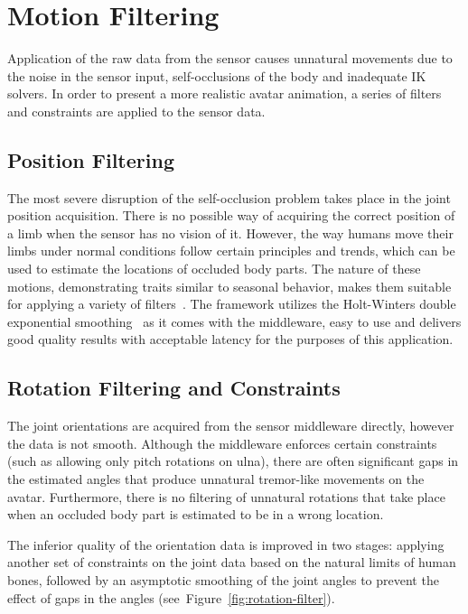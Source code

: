 \section{Motion Filtering}
\label{section_motion_filtering}

Application of the raw data from the sensor causes unnatural movements due to the noise in the sensor input, self-occlusions of the body and inadequate IK solvers. In order to present a more realistic avatar animation, a series of filters and constraints are applied to the sensor data. 

\subsection{Position Filtering}
The most severe disruption of the self-occlusion problem takes place in the joint position acquisition. There is no possible way of acquiring the correct position of a limb when the sensor has no vision of it. However, the way humans move their limbs under normal conditions follow certain principles and trends, which can be used to estimate the locations of occluded body parts. The nature of these motions, demonstrating traits similar to seasonal behavior, makes them suitable for applying a variety of filters~\cite{Azimi2012}. The framework utilizes the Holt-Winters double exponential smoothing~\cite{Holt2004,Kalekar2004}  as it comes with the middleware, easy to use and delivers good quality results with acceptable latency for the purposes of this application. 

\subsection{Rotation Filtering and Constraints}
The joint orientations are acquired from the sensor middleware directly, however the data is not smooth. Although the middleware enforces certain constraints (such as allowing only pitch rotations on ulna), there are often significant gaps in the estimated angles that produce unnatural tremor-like movements on the avatar. Furthermore, there is no filtering of unnatural rotations that take place when an occluded body part is estimated to be in a wrong location. 

The inferior quality of the orientation data is improved in two stages: applying another set of constraints on the joint data based on the natural limits of human bones, followed by an asymptotic smoothing of the joint angles to prevent the effect of gaps in the angles (see~Figure~\ref{fig:rotation-filter}). 


